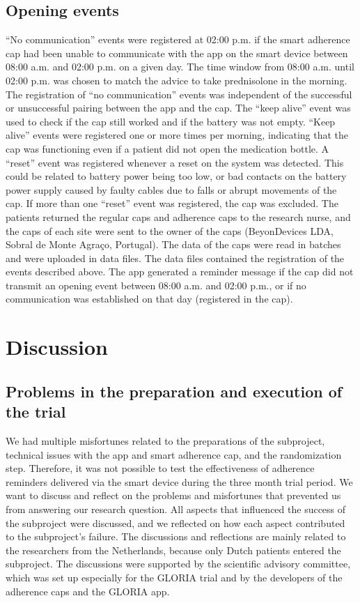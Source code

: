 \documentclass[twocolumn, issue, empirical, authordate]{jote-new-article}
\begin{document}
\subsection{Opening events}

 ``No communication'' events were registered at 02:00 p.m. if the smart adherence cap had been unable to communicate with the app on the smart device between 08:00 a.m. and 02:00 p.m. on a given day. The time window from 08:00 a.m. until 02:00 p.m. was chosen to match the advice to take prednisolone in the morning. The registration of ``no communication'' events was independent of the successful or unsuccessful pairing between the app and the cap. The ``keep alive'' event was used to check if the cap still worked and if the battery was not empty. ``Keep alive'' events were registered one or more times per morning, indicating that the cap was functioning even if a patient did not open the medication bottle. A ``reset'' event was registered whenever a reset on the system was detected. This could be related to battery power being too low, or bad contacts on the battery power supply caused by faulty cables due to falls or abrupt movements of the cap. If more than one ``reset'' event was registered, the cap was excluded.
 The patients returned the regular caps and adherence caps to the research nurse, and the caps of each site were sent to the owner of the caps (BeyonDevices LDA, Sobral de Monte Agra\c{c}o, Portugal). The data of the caps were read in batches and were uploaded in data files. The data files contained the registration of the events described above. The app generated a reminder message if the cap did not transmit an opening event between 08:00 a.m. and 02:00 p.m., or if no communication was established on that day (registered in the cap).


\section{Discussion}



\subsection{Problems in the preparation and execution of the trial}

 We had multiple misfortunes related to the preparations of the subproject, technical issues with the app and smart adherence cap, and the randomization step. Therefore, it was not possible to test the effectiveness of adherence reminders delivered via the smart device during the three month trial period.
 We want to discuss and reflect on the problems and misfortunes that prevented us from answering our research question. All aspects that influenced the success of the subproject were discussed, and we reflected on how each aspect contributed to the subproject's failure.
 The discussions and reflections are mainly related to the researchers from the Netherlands, because only Dutch patients entered the subproject. The discussions were supported by the scientific advisory committee, which was set up especially for the GLORIA trial and by the developers of the adherence caps and the GLORIA app.
\end{document}
